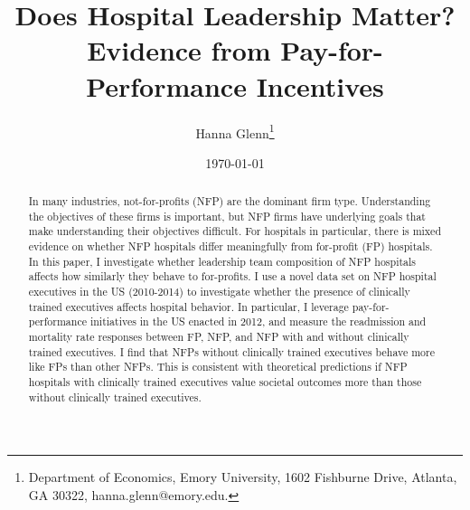 \documentclass[12pt]{article}
\begin{document}
	
	
	
	
	\linespread{1.2}\title{\vspace{-0.5in} Does Hospital Leadership Matter?\\ \large Evidence from Pay-for-Performance Incentives} 
	
	\date{\today}
	
	\author{\vspace{10mm}Hanna Glenn\footnote{Department of Economics, Emory University, 1602 Fishburne Drive, Atlanta, GA 30322, hanna.glenn@emory.edu.} }
	
	\maketitle
	
	\vspace{-0.2in}
	
	\singlespacing\maketitle


 \vspace{3mm}
	
    \begin{abstract}
		{\small
        In many industries, not-for-profits (NFP) are the dominant firm type. Understanding the objectives of these firms is important, but NFP firms have underlying goals that make understanding their objectives difficult. For hospitals in particular, there is mixed evidence on whether NFP hospitals differ meaningfully from for-profit (FP) hospitals. In this paper, I investigate whether leadership team composition of NFP hospitals affects how similarly they behave to for-profits. I use a novel data set on NFP hospital executives in the US (2010-2014) to investigate whether the presence of clinically trained executives affects hospital behavior. In particular, I leverage pay-for-performance initiatives in the US enacted in 2012, and measure the  readmission and mortality rate responses between FP, NFP, and NFP with and without clinically trained executives. I find that NFPs without clinically trained executives behave more like FPs than other NFPs. This is consistent with theoretical predictions if NFP hospitals with clinically trained executives value societal outcomes more than those without clinically trained executives.
		} 
	\end{abstract}
	
\end{document}
